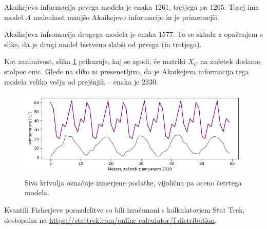 \documentclass[12pt, a4paper]{article}
\begin{document}
Akaikejeva informacija prvega modela je enaka $1261$,
tretjega pa $1265$. Torej ima model $A$ malenkost
manjšo Akaikejevo informacijo in je primernejši.

Akaikejeva infromacija drugega modela je enaka $1577$. 
To se sklada z opažanjem s slike, da je drugi model bistveno
slabši od prvega (in tretjega).

Kot zanimivost, slika \ref{png:cetrti} prikazuje, kaj se zgodi, 
če matriki $X_C$ na začetek dodamo stolpec enic.
Glede na sliko ni presenetljivo, da je Akaikejeva informacija tega modela veliko 
večja od prejšnjih -- enaka je $2330$.
\begin{figure}[H]
    \centering
    \includegraphics[width=14cm]{Slike/cetrti_model.png}
    \caption{Siva krivulja označuje izmerjene podatke, vijolična pa oceno 
    četrtega modela.}
    \label{png:cetrti}
\end{figure}

\newpage

\nocite{*}
\printbibliography
{}

Kvantili Fisherjeve porazdelitve so bili izračunani s kalkulatorjem Stat Trek,
dostopnim na \url{https://stattrek.com/online-calculator/f-distribution}.
\end{document}

